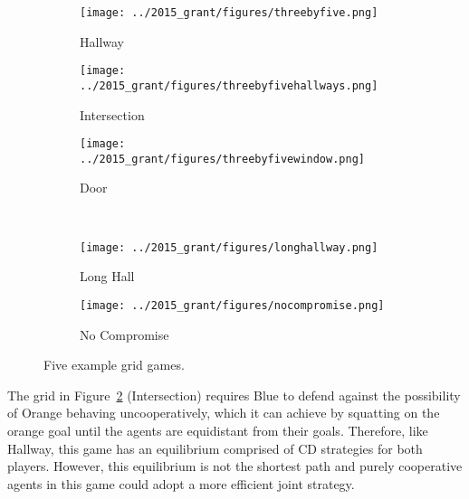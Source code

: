 \begin{figure}
\centering
\begin{subfigure}{.3\textwidth}
\centering
\texttt{[image: ../2015\_grant/figures/threebyfive.png]}
\caption{Hallway}
\label{fig:hallway}
\end{subfigure}
\begin{subfigure}{.3\textwidth}
\centering
\texttt{[image: ../2015\_grant/figures/threebyfivehallways.png]}
\caption{Intersection}
\label{fig:intersection}
\end{subfigure}
\begin{subfigure}{.3\textwidth}
\centering
\texttt{[image: ../2015\_grant/figures/threebyfivewindow.png]}
\caption{Door}
\label{fig:door}
\end{subfigure} \\ [2.5ex]
\begin{subfigure}{.367\textwidth}
\centering
\texttt{[image: ../2015\_grant/figures/longhallway.png]}
\caption{Long Hall}
\label{fig:longhallway}
\end{subfigure}
\begin{subfigure}{.367\textwidth}
\centering
\texttt{[image: ../2015\_grant/figures/nocompromise.png]}
\caption{No Compromise}
\label{fig:nocompromise}
\end{subfigure}
\caption{Five example grid games.}
\end{figure}

The grid in Figure~\ref{fig:intersection} (Intersection) requires Blue
to defend against the possibility of Orange behaving uncooperatively,
which it can achieve by squatting on the orange goal until the agents are equidistant from their goals.  
Therefore, like Hallway, this game has an equilibrium comprised of CD strategies
for both players. However, this equilibrium is not the shortest path
and purely cooperative agents in this game could adopt a more
efficient joint strategy.


